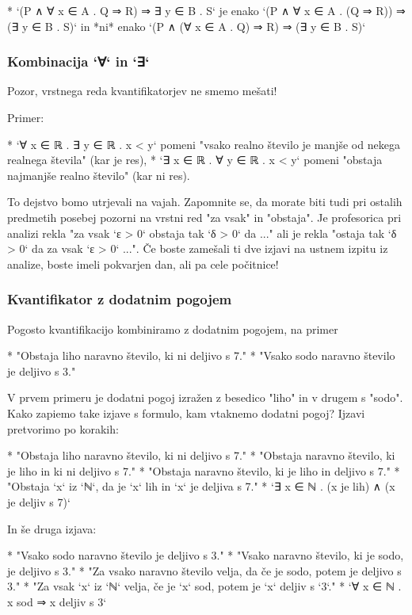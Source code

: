 * `(P ∧ ∀ x ∈ A . Q ⇒ R) ⇒ ∃ y ∈ B . S` je enako `(P ∧ ∀ x ∈ A . (Q ⇒ R)) ⇒ (∃ y ∈ B . S)` in *ni* enako 
  `(P ∧ (∀ x ∈ A . Q) ⇒ R) ⇒ (∃ y ∈ B . S)`


\subsubsection{Kombinacija `∀` in `∃`}

Pozor, vrstnega reda kvantifikatorjev ne smemo mešati!

Primer:

* `∀ x ∈ ℝ . ∃ y ∈ ℝ . x < y` pomeni "vsako realno število je manjše od nekega realnega števila" (kar je res),
* `∃ x ∈ ℝ . ∀ y ∈ ℝ . x < y` pomeni "obstaja najmanjše realno število" (kar ni res).

To dejstvo bomo utrjevali na vajah. Zapomnite se, da morate biti tudi pri ostalih predmetih posebej pozorni na vrstni red
"za vsak" in "obstaja". Je profesorica pri analizi rekla "za vsak `ε > 0` obstaja tak `δ > 0` da ..." ali je rekla
"ostaja tak `δ > 0` da za vsak `ε > 0` ...". Če boste zamešali ti dve izjavi na ustnem izpitu iz analize,
boste imeli pokvarjen dan, ali pa cele počitnice!


\subsubsection{Kvantifikator z dodatnim pogojem}

Pogosto kvantifikacijo kombiniramo z dodatnim pogojem, na primer

* "Obstaja liho naravno število, ki ni deljivo s 7."
* "Vsako sodo naravno število je deljivo s 3."

V prvem primeru je dodatni pogoj izražen z besedico "liho" in v drugem s "sodo". Kako zapiemo take izjave s formulo, kam
vtaknemo dodatni pogoj? Ijzavi pretvorimo po korakih:

* "Obstaja liho naravno število, ki ni deljivo s 7."
* "Obstaja naravno število, ki je liho in ki ni deljivo s 7."
* "Obstaja naravno število, ki je liho in deljivo s 7."
* "Obstaja `x` iz `ℕ`, da je `x` lih in `x` je deljiva s 7."
* `∃ x ∈ ℕ . (x je lih) ∧ (x je deljiv s 7)`

In še druga izjava:

* "Vsako sodo naravno število je deljivo s 3."
* "Vsako naravno število, ki je sodo, je deljivo s 3."
* "Za vsako naravno število velja, da če je sodo, potem je deljivo s 3."
* "Za vsak `x` iz `ℕ` velja, če je `x` sod, potem je `x` deljiv s `3`."
* `∀ x ∈ ℕ . x sod ⇒ x deljiv s 3`

